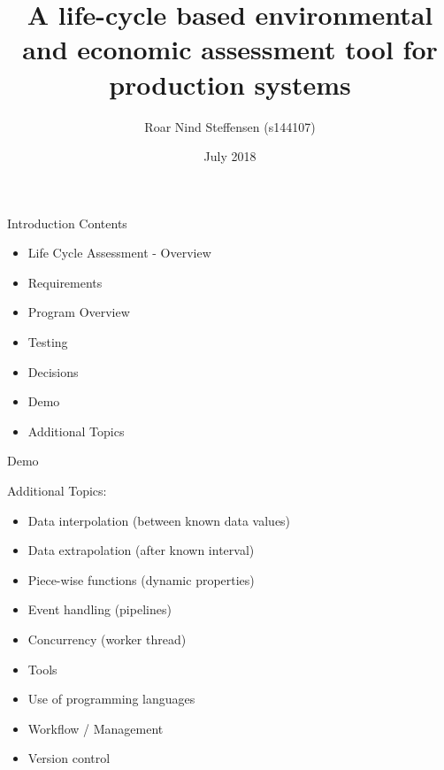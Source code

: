 \documentclass[handout]{beamer}
\title
  {A life-cycle based environmental and economic assessment tool for production systems}
\author
  {Roar Nind Steffensen (s144107)}
\date
{July 2018}
\institute
  {Technical University of Denmark}
\begin{document}
\maketitle

\begin{frame}{Introduction}
Contents
\begin{itemize}
    \item Life Cycle Assessment - Overview
    \item Requirements
    \item Program Overview
    \item Testing
    \item Decisions
    \item Demo
    \item Additional Topics
\end{itemize}
\end{frame}







\begin{frame}{}
    \centering
    \Huge
    Demo
\end{frame}

\begin{frame}{}
Additional Topics:
\begin{itemize}
    \item Data interpolation (between known data values)
    \item Data extrapolation (after known interval)
    \item Piece-wise functions (dynamic properties)
    \item Event handling (pipelines)
    \item Concurrency (worker thread)
    \item Tools
    \item Use of programming languages
    \item Workflow / Management
    \item Version control
\end{itemize}
\end{frame}
\end{document}

